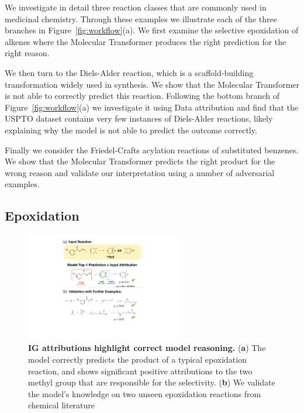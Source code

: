 We investigate in detail three reaction classes that are commonly used in medicinal chemistry. Through these examples we illustrate each of the three branches in Figure~\ref{fig:workflow}(a). We first examine the selective epoxidation of alkenes where the Molecular Transformer produces the right prediction for the right reason.

We then turn to the Diels-Alder reaction, which is a scaffold-building transformation widely used in synthesis. We show that the Molecular Transformer is not able to correctly predict this reaction. Following the bottom branch of Figure~\ref{fig:workflow}(a) we investigate it using Data attribution and find that the USPTO dataset contains very few instances of Diels-Alder reactions, likely explaining why the model is not able to predict the outcome correctly.

Finally we consider the Friedel-Crafts acylation reactions of substituted benzenes. We show that the Molecular Transformer predicts the right product for the wrong reason and validate our interpretation using a number of adversarial examples.

\subsection{Epoxidation}

\begin{figure}[ht!]
    \centering
    \includegraphics[width=0.6\textwidth]{Chapters/Transformer/Figs/epoxidation.pdf}
    \caption{\label{fig:epoxide} \textbf{IG attributions highlight correct model reasoning.} (\textbf{a}) The model correctly predicts the product of a typical epoxidation reaction, and shows significant positive attributions to the two methyl group that are responsible for the selectivity. (\textbf{b}) We validate the model's knowledge on two unseen epoxidation reactions from chemical literature~\cite{Lluch1993}}
\end{figure}

